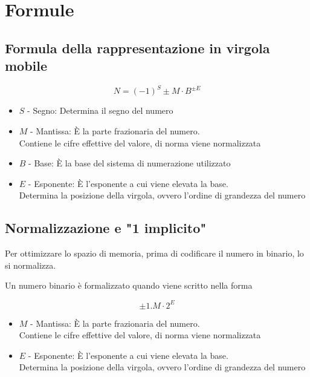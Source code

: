 \section{Formule}
\subsection{Formula della rappresentazione in virgola mobile}
\begin{tcolorbox}
    {
        \LARGE
        $$
            N = (-1)^S \pm M \cdot B^{\pm E}
        $$
    }
    \begin{itemize}
        \item $S$ - Segno: Determina il segno del numero
        \item $M$ - Mantissa: È la parte frazionaria del numero. \\
        Contiene le cifre effettive del valore, di norma viene normalizzata
        \item $B$ - Base: È la base del sistema di numerazione utilizzato
        \item $E$ - Esponente: È l'esponente a cui viene elevata la base.\\
        Determina la posizione della virgola, ovvero l'ordine di grandezza del numero
    \end{itemize}
\end{tcolorbox}

\newpage
\subsection{Normalizzazione e "1 implicito"}
Per ottimizzare lo spazio di memoria, prima di codificare il numero in binario, lo si normalizza.

Un numero binario è formalizzato quando viene scritto nella forma

\begin{tcolorbox}
    {
        \LARGE
        $$
            \pm 1.M \cdot 2^E
        $$
    }    

    \begin{itemize}
        \item $M$ - Mantissa: È la parte frazionaria del numero. \\
        Contiene le cifre effettive del valore, di norma viene normalizzata
        \item $E$ - Esponente: È l'esponente a cui viene elevata la base.\\
        Determina la posizione della virgola, ovvero l'ordine di grandezza del numero
    \end{itemize}
\end{tcolorbox}

